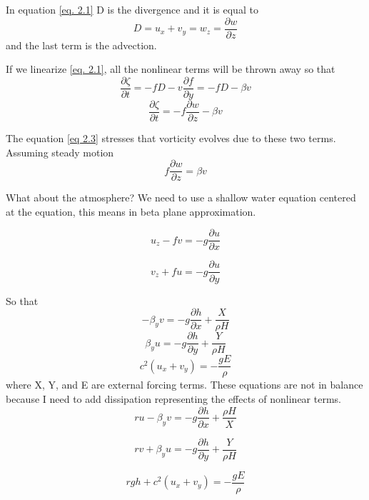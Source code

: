 In equation \ref{eq. 2.1} D is the divergence and it is equal to
\begin{equation}
	D=u_x + v_y = w_z = \frac{\partial w}{\partial z}
\end{equation}
and the last term is the advection.


If we linearize \ref{eq. 2.1}, all the nonlinear terms will be thrown away so that
\begin{equation}\label{eq 2.3}
	\frac{\partial \zeta}{\partial t} = - f D - v \frac{\partial f}{\partial y} = - f D - \beta v
\end{equation}
\begin{equation}
	\frac{\partial \zeta}{\partial t} = - f \frac{\partial w}{\partial z} - \beta v
\end{equation}

The equation \ref{eq 2.3} stresses that vorticity evolves due to these two terms.
Assuming steady motion
\begin{equation}
	f \frac{\partial w}{\partial z} = \beta v
\end{equation}

What about the atmosphere?
We need to use a shallow water equation centered at the equation, this means in beta plane approximation.

\begin{equation}
	u_z- fv = -g \frac{\partial u}{\partial x}
\end{equation}

\begin{equation}
	v_z + fu = -g \frac{\partial u}{\partial y}
\end{equation}

So that
$$-\beta_y v = -g \frac{\partial h}{\partial x} + \frac{X}{\rho H}$$
$$\beta_y u = -g \frac{\partial h}{\partial y} + \frac{Y}{\rho H}$$
$$c^2 (u_x + v_y) = -\frac{gE}{\rho}$$
where X, Y, and E are external forcing terms.
These equations are not in balance because I need to add dissipation representing the effects of nonlinear terms.
\begin{equation}\label{eq 2.8}
	r u - \beta_y v = -g \frac{\partial h}{\partial x} + \frac{\rho H}{X}
\end{equation}


\begin{equation}\label{eq 2.9}
	r v +\beta_y u = -g \frac{\partial h}{\partial y} + \frac{Y}{\rho H}
\end{equation}

\begin{equation}\label{eq 2.10}
	r g h + c^2 (u_x + v_y) = -\frac{gE}{\rho}
\end{equation}




